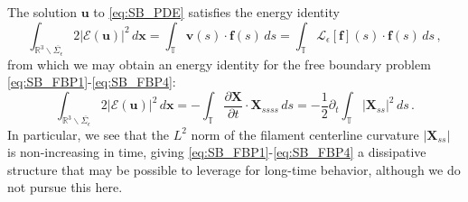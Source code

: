 \documentclass[11pt,reqno]{amsart}
\newcommand{\R}{\mathbb{R}}
\newcommand{\T}{\mathbb{T}}
\newcommand{\E}{\mathcal{E}}
\newcommand{\bu}{\bm{u}}
\newcommand{\bx}{\bm{x}}
\newcommand{\X}{\bm{X}}
\newcommand{\bv}{\bm{v}}
\newcommand{\p}{\partial}
\newcommand{\abs}[1]{\left\lvert #1 \right\rvert}
\newcommand{\mc}[1]{\mathcal{#1}}
\theoremstyle{definition}
\begin{document}
The solution $\bu$ to \eqref{eq:SB_PDE} satisfies the energy identity
\begin{equation}\label{eq:energyID}
\int_{\R^3\backslash \overline{\Sigma_\epsilon}} 2\abs{\E(\bu)}^2\,d\bx = \int_\T \bv(s)\cdot\bm{f}(s)\,ds = \int_\T \mc{L}_\epsilon[\bm{f}](s)\cdot\bm{f}(s)\,ds\,,
\end{equation}
from which we may obtain an energy identity for the free boundary problem \eqref{eq:SB_FBP1}-\eqref{eq:SB_FBP4}: 
\begin{equation}\label{eq:dynamic_energy}
\int_{\R^3\backslash \overline{\Sigma_\epsilon}} 2\abs{\E(\bu)}^2\,d\bx = -\int_\T \frac{\p\X}{\p t}\cdot\X_{ssss}\,ds = -\frac{1}{2}\p_t\int_\T \abs{\X_{ss}}^2\,ds\,.
\end{equation}
In particular, we see that the $L^2$ norm of the filament centerline curvature $\abs{\X_{ss}}$ is non-increasing in time, giving \eqref{eq:SB_FBP1}-\eqref{eq:SB_FBP4} a dissipative structure that may be possible to leverage for long-time behavior, although we do not pursue this here. 





\end{document}
